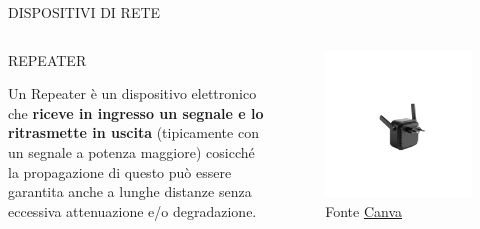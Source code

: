 \documentclass[aspectratio=1610,handout]{beamer}
\begin{document}
\begin{frame}{DISPOSITIVI DI RETE}
    \begin{columns}
            \justifying
            \begin{alertblock}{REPEATER}
                \begin{minipage}{0.96\linewidth}
                    \justifying
                    Un Repeater è un dispositivo elettronico che \textbf{riceve in ingresso un 
                    segnale e lo ritrasmette in uscita} (tipicamente con un segnale a potenza maggiore) 
                    cosicché la propagazione di questo può essere garantita anche a lunghe 
                    distanze senza eccessiva attenuazione e/o degradazione.
                \end{minipage}
            \end{alertblock}
            \begin{figure}
                \includegraphics[width=\linewidth]{img/repeater.png}
                \caption{{Fonte \href{https://www.canva.com/}{Canva}}}
            \end{figure}
    \end{columns}
\end{frame}
\end{document}
